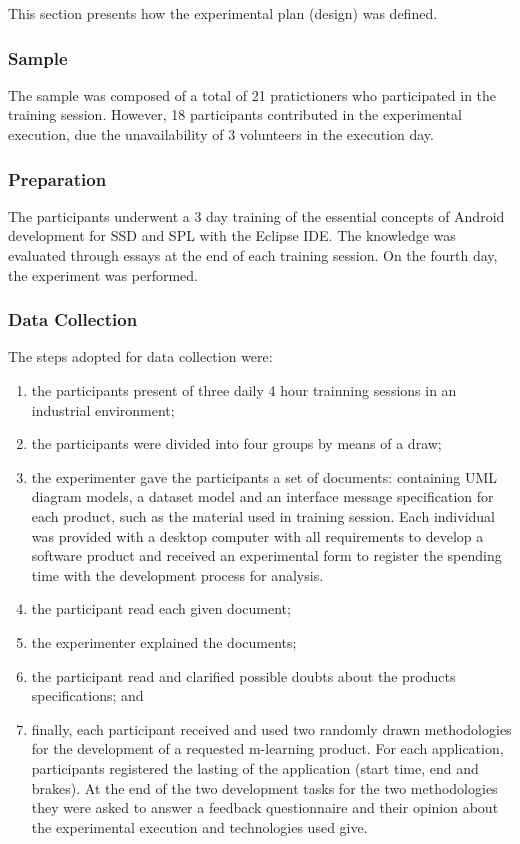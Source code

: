 This section presents how the experimental plan (design) was defined.

\subsubsection{Sample}

The sample was composed of a total of 21 pratictioners who participated in the training session. However, 18 participants contributed in the experimental execution, due the unavailability of 3 volunteers in the execution day.

\subsubsection{Preparation}

The participants underwent a 3 day training of the essential concepts of Android development for SSD and SPL with the Eclipse IDE. The knowledge was evaluated through essays at the end of each training session. On the fourth day, the experiment was performed.

\subsubsection{Data Collection}

The steps adopted for data collection were:

\begin{enumerate}

\item the participants present of three daily 4 hour trainning sessions in an industrial environment;

\item the participants were divided into four groups by means of a draw;
\item the experimenter gave the participants a set of documents: containing UML diagram models, a dataset model and an interface message specification for each product, such as the material used in training session. Each individual was provided with a desktop computer with all requirements to develop a software product and received an experimental form to register the spending time with the development process for analysis.
\item the participant read each given document;
\item the experimenter explained the documents;
\item the participant read and clarified possible doubts about the products specifications; and
\item finally, each participant received and used two randomly drawn methodologies for the development of a requested m-learning product. For each application, participants registered the lasting of the application (start time, end and brakes). At the end of the two development tasks for the two methodologies they were asked to answer a feedback questionnaire and their opinion about the experimental execution and technologies used give.
\end{enumerate}

